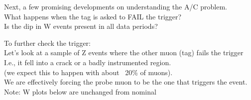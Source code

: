 \begin{frame}[label=TAGPROBE]
Next, a few promising developments on understanding the A/C problem. \\
What happens when the tag is asked to FAIL the trigger? \\
Is the dip in W events present in all data periods?
\end{frame}

 {
To further check the trigger: \\
Let's look at a sample of Z events where the other muon (tag) fails the trigger \\
I.e., it fell into a crack or a badly instrumented region. \\
(we expect this to happen with about ~20\% of muons). \\
We are effectively forcing the probe muon to be the one that triggers the event. \\
\small{ Note: W plots below are unchanged from nominal }
}

